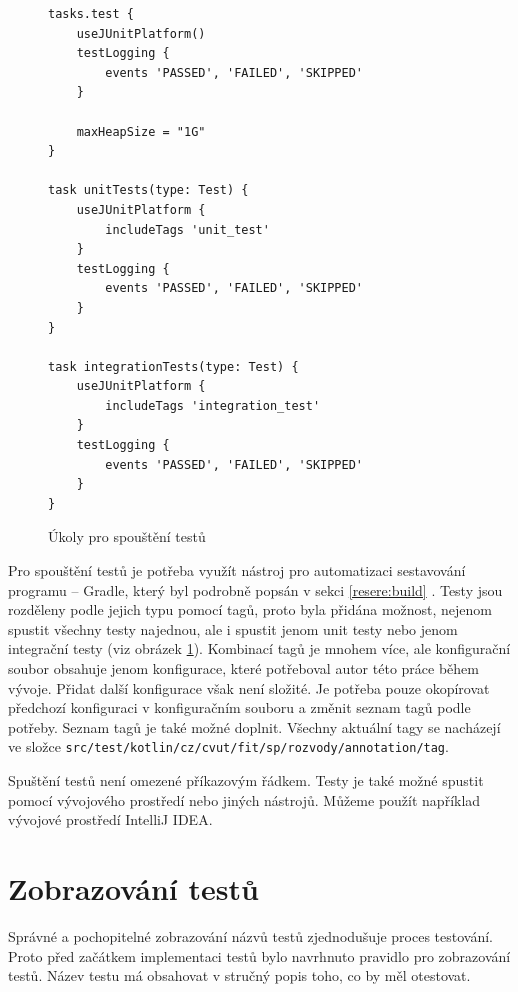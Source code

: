     \begin{figure}
        \begin{verbatim}
tasks.test {
    useJUnitPlatform()
    testLogging {
        events 'PASSED', 'FAILED', 'SKIPPED'
    }

    maxHeapSize = "1G"
}

task unitTests(type: Test) {
    useJUnitPlatform {
        includeTags 'unit_test'
    }
    testLogging {
        events 'PASSED', 'FAILED', 'SKIPPED'
    }
}

task integrationTests(type: Test) {
    useJUnitPlatform {
        includeTags 'integration_test'
    }
    testLogging {
        events 'PASSED', 'FAILED', 'SKIPPED'
    }
}
        \end{verbatim}
        \caption{Úkoly pro spouštění testů} 
        \label{code:gradle-tests}
    \end{figure}
    Pro spouštění testů je potřeba využít nástroj pro automatizaci sestavování programu -- Gradle, který byl podrobně popsán v sekci \ref{resere:build} . Testy jsou rozděleny podle jejich typu pomocí tagů, proto byla přidána možnost, nejenom spustit všechny testy najednou, ale i spustit jenom unit testy nebo jenom integrační testy (viz obrázek \ref{code:gradle-tests}). Kombinací tagů je mnohem více, ale konfigurační soubor obsahuje jenom konfigurace, které potřeboval autor této práce během vývoje. 
    Přidat další konfigurace však není složité. Je potřeba pouze okopírovat předchozí konfiguraci v konfiguračním souboru a změnit seznam tagů podle potřeby. Seznam tagů je také možné doplnit. Všechny aktuální tagy se nacházejí ve složce \verb|src/test/kotlin/cz/cvut/fit/sp/rozvody/annotation/tag|.
    
    Spuštění testů není omezené příkazovým řádkem. Testy je také možné spustit pomocí vývojového prostředí nebo jiných nástrojů. Můžeme použít například vývojové prostředí IntelliJ IDEA. 
\section{Zobrazování testů}\label{testovani:zobrazovani}
    Správné a pochopitelné zobrazování názvů testů zjednodušuje proces testování. Proto před začátkem implementaci testů bylo navrhnuto pravidlo pro zobrazování testů. Název testu má obsahovat v stručný popis toho, co by měl otestovat. 
    
